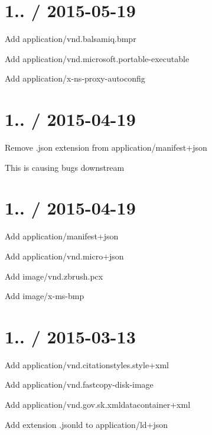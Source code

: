 \section*{1.. / 2015-\/05-\/19 }


\begin{DoxyItemize}
\item Add {\ttfamily application/vnd.\+balsamiq.\+bmpr}
\item Add {\ttfamily application/vnd.\+microsoft.\+portable-\/executable}
\item Add {\ttfamily application/x-\/ns-\/proxy-\/autoconfig}
\end{DoxyItemize}

\section*{1.. / 2015-\/04-\/19 }


\begin{DoxyItemize}
\item Remove {\ttfamily .json} extension from {\ttfamily application/manifest+json}
\begin{DoxyItemize}
\item This is causing bugs downstream
\end{DoxyItemize}
\end{DoxyItemize}

\section*{1.. / 2015-\/04-\/19 }


\begin{DoxyItemize}
\item Add {\ttfamily application/manifest+json}
\item Add {\ttfamily application/vnd.\+micro+json}
\item Add {\ttfamily image/vnd.\+zbrush.\+pcx}
\item Add {\ttfamily image/x-\/ms-\/bmp}
\end{DoxyItemize}

\section*{1.. / 2015-\/03-\/13 }


\begin{DoxyItemize}
\item Add {\ttfamily application/vnd.\+citationstyles.\+style+xml}
\item Add {\ttfamily application/vnd.\+fastcopy-\/disk-\/image}
\item Add {\ttfamily application/vnd.\+gov.\+sk.\+xmldatacontainer+xml}
\item Add extension {\ttfamily .jsonld} to {\ttfamily application/ld+json}
\end{DoxyItemize}

